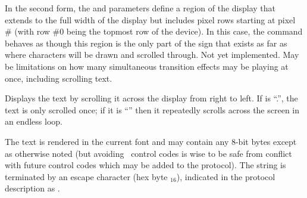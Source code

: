 In the second form, the  and  parameters define a region of the display that extends to the full width of the
display but includes  pixel rows starting at pixel \# (with row \#0 being the topmost row of the device). In this
case, the command behaves as though this region is the only part of the sign that exists as far as where characters will be drawn and
scrolled through. {\color{red} Not yet implemented. May be limitations on how many simultaneous
transition effects may be playing at once, including scrolling text.}

Displays the text  by scrolling it across the display from right to left.
If  is ``\z.'', the text is only scrolled once; if it is ``'' then it
repeatedly scrolls across the screen in an endless loop.

The text is rendered in the current font and may contain any 8-bit bytes except as otherwise
noted (but avoiding \ascii\ control codes is wise to be safe from conflict with
future control codes which may be added to the protocol). The string is terminated by an
escape character (hex byte $_{16}$), indicated in the protocol description as .

